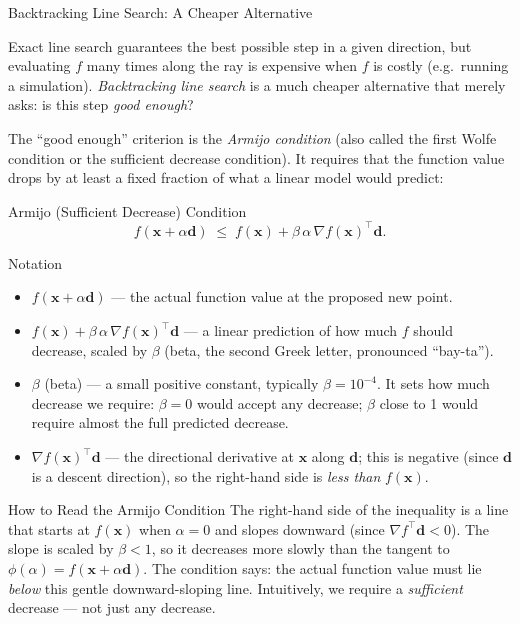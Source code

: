 \documentclass[aspectratio=169,10pt]{beamer}
\newcommand{\bx}{\mathbf{x}}
\newcommand{\bd}{\mathbf{d}}
\newcommand{\grad}{\nabla}
\begin{document}
\begin{frame}[allowframebreaks]{Backtracking Line Search: A Cheaper Alternative}

  Exact line search guarantees the best possible step in a given
  direction, but evaluating $f$ many times along the ray is expensive
  when $f$ is costly (e.g.\ running a simulation).  \emph{Backtracking
  line search} is a much cheaper alternative that merely asks: is this
  step \emph{good enough}?

  The ``good enough'' criterion is the \emph{Armijo condition} (also
  called the first Wolfe condition or the sufficient decrease condition).
  It requires that the function value drops by at least a fixed fraction
  of what a linear model would predict:

  \begin{block}{Armijo (Sufficient Decrease) Condition}
    \[
      f(\bx + \alpha\bd)
      \;\le\;
      f(\bx) + \beta\,\alpha\,\grad f(\bx)^{\top}\bd.
    \]
  \end{block}

  \begin{block}{Notation}
    \begin{itemize}
      \item $f(\bx + \alpha\bd)$ --- the actual function value at the
            proposed new point.
      \item $f(\bx) + \beta\,\alpha\,\grad f(\bx)^{\top}\bd$ --- a linear
            prediction of how much $f$ should decrease, scaled by $\beta$
            (beta, the second Greek letter, pronounced ``bay-ta'').
      \item $\beta$ (beta) --- a small positive constant, typically
            $\beta = 10^{-4}$.  It sets how much decrease we require:
            $\beta = 0$ would accept any decrease; $\beta$ close to 1
            would require almost the full predicted decrease.
      \item $\grad f(\bx)^{\top}\bd$ --- the directional derivative at
            $\bx$ along $\bd$; this is negative (since $\bd$ is a descent
            direction), so the right-hand side is \emph{less than}
            $f(\bx)$.
    \end{itemize}
  \end{block}

  \framebreak

  \begin{alertblock}{How to Read the Armijo Condition}
    The right-hand side of the inequality is a line that starts at
    $f(\bx)$ when $\alpha = 0$ and slopes downward (since
    $\grad f^{\top}\bd < 0$).  The slope is scaled by $\beta < 1$, so
    it decreases more slowly than the tangent to $\phi(\alpha) = f(\bx
    + \alpha\bd)$.  The condition says: the actual function value must
    lie \emph{below} this gentle downward-sloping line.  Intuitively,
    we require a \emph{sufficient} decrease --- not just any decrease.
  \end{alertblock}


\end{frame}
\end{document}
